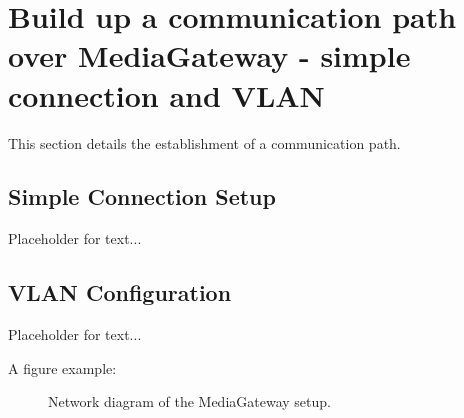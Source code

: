 \section{Build up a communication path over MediaGateway - simple connection and VLAN}
\label{sec:mediagateway}

This section details the establishment of a communication path.

\subsection{Simple Connection Setup}
Placeholder for text...

\subsection{VLAN Configuration}
Placeholder for text...

A figure example:
\begin{figure}[h]
    \centering
    \caption{Network diagram of the MediaGateway setup.}
    \label{fig:mediagateway_setup}
\end{figure}